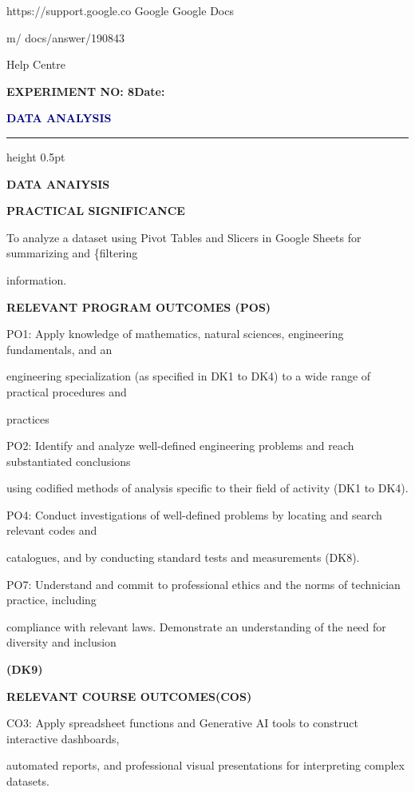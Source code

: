 \documentclass[10pt,a4paper]{article}
\newcommand{\expheading}[2]{%
  \vspace{0.1cm}\noindent\textbf{\large EXPERIMENT NO: #1}\hfill\textbf{Date: #2}\par
}
\newcommand{\exptitle}[1]{%
  \begin{center}\vspace{-2mm}\textcolor{navy}{\fontsize{20}{22}\selectfont\bfseries #1}\end{center}
  \vspace{1mm}\hrule height 0.5pt\vspace{3mm}
}
\begin{document}
                           https://support.google.co   Google           Google Docs\par
\noindent m/                                           docs/answer/190843\par
\noindent Help Centre\par
\clearpage
\expheading{8}{\underline{\hspace{1.8cm}}}
\exptitle{DATA ANALYSIS}
\medskip\noindent\textbf{DATA ANAIYSIS}\par

\medskip\noindent\textbf{PRACTICAL SIGNIFICANCE}\par
\noindent To analyze a dataset using Pivot Tables and Slicers in Google Sheets for summarizing and \{filtering\par
\noindent information.\par
\medskip\noindent\textbf{RELEVANT PROGRAM OUTCOMES (POS)}\par
\noindent PO1: Apply knowledge of mathematics, natural sciences, engineering fundamentals, and an\par
\noindent engineering specialization (as specified in DK1 to DK4) to a wide range of practical procedures and\par
\noindent practices\par
\noindent PO2: Identify and analyze well-defined engineering problems and reach substantiated conclusions\par
\noindent using codified methods of analysis specific to their field of activity (DK1 to DK4).\par
\noindent PO4: Conduct investigations of well-defined problems by locating and search relevant codes and\par
\noindent catalogues, and by conducting standard tests and measurements (DK8).\par
\noindent PO7: Understand and commit to professional ethics and the norms of technician practice, including\par
\noindent compliance with relevant laws. Demonstrate an understanding of the need for diversity and inclusion\par
\medskip\noindent\textbf{(DK9)}\par

\medskip\noindent\textbf{RELEVANT COURSE OUTCOMES(COS)}\par
\noindent CO3: Apply spreadsheet functions and Generative AI tools to construct interactive dashboards,\par
\noindent automated reports, and professional visual presentations for interpreting complex datasets.\par
\end{document}

